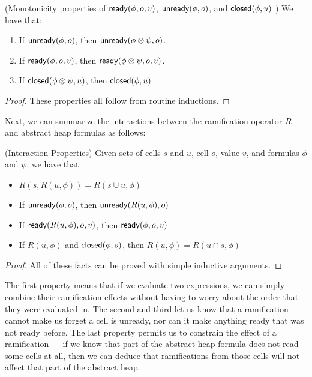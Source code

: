 \begin{prop}{(Monotonicity properties of $\mathsf{ready}({\phi}, {o}, {v})$, $\mathsf{unready}({\phi}, {o})$, and $\mathsf{closed}({\phi}, {u})$ )}
We have that:
\begin{enumerate}
\item If $\mathsf{unready}({\phi}, {o})$, then $\mathsf{unready}({\phi \otimes \psi}, {o})$.
\item If $\mathsf{ready}({\phi}, {o}, {v})$, then $\mathsf{ready}({\phi \otimes \psi}, {o}, {v})$.
\item If $\mathsf{closed}({\phi \otimes \psi}, {u})$, then $\mathsf{closed}({\phi}, {u})$
\end{enumerate}
\end{prop}
\begin{proof}
These properties all follow from routine inductions. 
\end{proof}

Next, we can summarize the interactions between the ramification
operator $R$ and abstract heap formulas as follows:

\begin{prop}{(Interaction Properties)}
Given sets of cells $s$ and $u$, cell $o$, value $v$, and formulas $\phi$ and $\psi$, we have
that:
\begin{itemize}
\item $R(s, R(u, \phi)) = R(s \cup u, \phi)$
\item If $\mathsf{unready}({\phi}, {o})$, then $\mathsf{unready}({R(u, \phi)}, {o})$ 
\item If $\mathsf{ready}({R(u, \phi)}, {o}, {v})$, then $\mathsf{ready}({\phi}, {o}, {v})$ 
\item If $R(u, \phi)$ and $\mathsf{closed}({\phi}, {s})$, then $R(u, \phi) = R(u \cap s, \phi)$ 
\end{itemize}
\end{prop}
\begin{proof}
All of these facts can be proved with simple inductive arguments. 
\end{proof}

The first property means that if we evaluate two expressions, we can
simply combine their ramification effects without having to worry
about the order that they were evaluated in. The second and third let
us know that a ramification cannot make us forget a cell is unready,
nor can it make anything ready that was not ready before. The last
property permits us to constrain the effect of a ramification --- if
we know that part of the abstract heap formula does not read some
cells at all, then we can deduce that ramifications from those cells
will not affect that part of the abstract heap.


